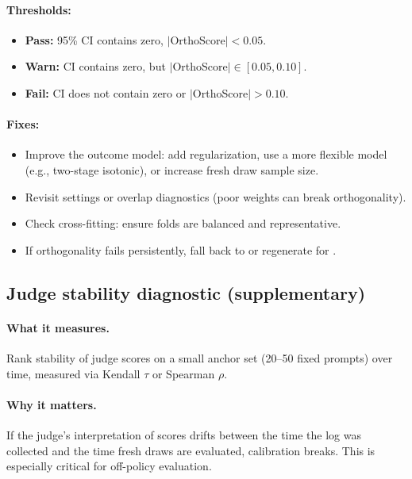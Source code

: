 \paragraph{Thresholds:}
\begin{itemize}
\item \textbf{Pass:} 95\% CI contains zero, $|$OrthoScore$| < 0.05$.
\item \textbf{Warn:} CI contains zero, but $|$OrthoScore$| \in [0.05, 0.10]$.
\item \textbf{Fail:} CI does not contain zero or $|$OrthoScore$| > 0.10$.
\end{itemize}

\paragraph{Fixes:}
\begin{itemize}
\item Improve the outcome model: add regularization, use a more flexible model (e.g., two-stage isotonic), or increase fresh draw sample size.
\item Revisit \simcal{} settings or overlap diagnostics (poor weights can break orthogonality).
\item Check cross-fitting: ensure folds are balanced and representative.
\item If orthogonality fails persistently, fall back to \ips{} or regenerate for \dm.
\end{itemize}

\subsection{Judge stability diagnostic (supplementary)}

\paragraph{What it measures.} Rank stability of judge scores on a small anchor set (20--50 fixed prompts) over time, measured via Kendall $\tau$ or Spearman $\rho$.

\paragraph{Why it matters.} If the judge's interpretation of scores drifts between the time the log was collected and the time fresh draws are evaluated, calibration breaks. This is especially critical for off-policy evaluation.

